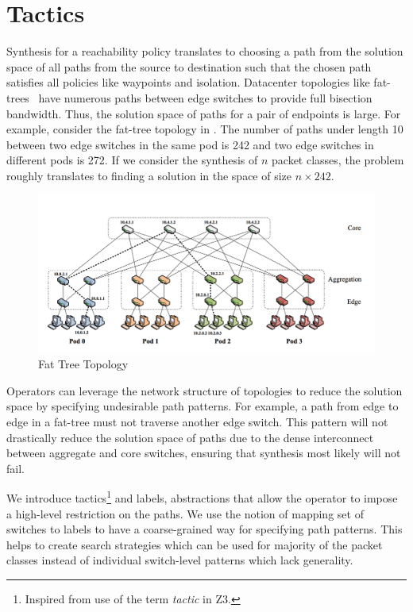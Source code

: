 \section{Tactics} \label{sec:tactic}
Synthesis for a reachability policy translates to choosing a path from the 
solution space of all paths from the source to destination such that the 
chosen path satisfies all policies like waypoints and isolation. Datacenter 
topologies like fat-trees~\cite{fattree} have numerous paths between 
edge switches to provide full bisection bandwidth. 
Thus, the solution space of paths for a pair of endpoints is large. 
For example, consider the fat-tree topology in . 
The number of paths under length 10 between two edge  switches 
in the same pod is 242 and two edge switches in different pods is 272. 
If we consider the synthesis of $n$ packet classes, the problem 
roughly translates to finding a solution in the space of size $n \times 242$.
\begin{figure}[h]
	\includegraphics[width=\columnwidth]{figures/fattree.png}
	\caption{Fat Tree Topology}
	\label{fig:fattree}
\end{figure}
Operators can leverage the network structure of topologies
 to reduce the solution space by specifying undesirable path patterns. 
 For example, a path from edge to edge in a fat-tree must not traverse another edge switch.
 This pattern will not drastically reduce the solution space of paths 
 due to the dense interconnect between aggregate and core switches,
 ensuring that synthesis most likely will not fail. 

We introduce tactics\footnote{
	Inspired from use of the term \emph{tactic} in Z3.} 
and labels, abstractions that allow the 
operator to impose a high-level restriction on the paths. 
We use the notion of mapping set of switches to labels to 
have a coarse-grained way for specifying path patterns. This helps
to create search strategies which can be used for majority 
of the packet classes instead of individual switch-level patterns which
lack generality.

